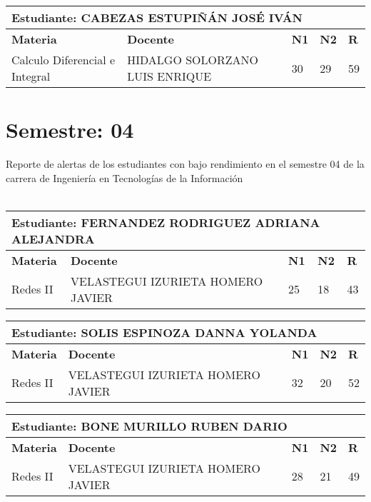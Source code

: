 \small
\begin{tabularx}{\textwidth}{|p{5cm}|p{7cm}|X|X|X|}
\hline
\multicolumn{5}{|p{\dimexpr\textwidth-2\tabcolsep-2\arrayrulewidth}|}{\textbf{Estudiante: CABEZAS ESTUPIÑÁN JOSÉ IVÁN }}\\\hline
\textbf{Materia} & \textbf{Docente} & \textbf{N1} & \textbf{N2} & \textbf{R} \\ \hline
Calculo Diferencial e Integral & HIDALGO SOLORZANO LUIS ENRIQUE  & 30 & 29& 59 \\ \hline
\end{tabularx}\vspace{10mm}
\section{Semestre: 04}
        Reporte de alertas de los estudiantes con bajo rendimiento en el semestre 04 de la carrera de 
        Ingeniería en Tecnologías de la Información\\\\\small
\begin{tabularx}{\textwidth}{|p{5cm}|p{7cm}|X|X|X|}
\hline
\multicolumn{5}{|p{\dimexpr\textwidth-2\tabcolsep-2\arrayrulewidth}|}{\textbf{Estudiante: FERNANDEZ RODRIGUEZ ADRIANA ALEJANDRA }}\\\hline
\textbf{Materia} & \textbf{Docente} & \textbf{N1} & \textbf{N2} & \textbf{R} \\ \hline
Redes II & VELASTEGUI IZURIETA HOMERO JAVIER  & 25 & 18& 43 \\ \hline
\end{tabularx}\vspace{10mm}
\small
\begin{tabularx}{\textwidth}{|p{5cm}|p{7cm}|X|X|X|}
\hline
\multicolumn{5}{|p{\dimexpr\textwidth-2\tabcolsep-2\arrayrulewidth}|}{\textbf{Estudiante: SOLIS ESPINOZA DANNA YOLANDA }}\\\hline
\textbf{Materia} & \textbf{Docente} & \textbf{N1} & \textbf{N2} & \textbf{R} \\ \hline
Redes II & VELASTEGUI IZURIETA HOMERO JAVIER  & 32 & 20& 52 \\ \hline
\end{tabularx}\vspace{10mm}
\small
\begin{tabularx}{\textwidth}{|p{5cm}|p{7cm}|X|X|X|}
\hline
\multicolumn{5}{|p{\dimexpr\textwidth-2\tabcolsep-2\arrayrulewidth}|}{\textbf{Estudiante: BONE MURILLO RUBEN DARIO }}\\\hline
\textbf{Materia} & \textbf{Docente} & \textbf{N1} & \textbf{N2} & \textbf{R} \\ \hline
Redes II & VELASTEGUI IZURIETA HOMERO JAVIER  & 28 & 21& 49 \\ \hline
\end{tabularx}\vspace{10mm}
